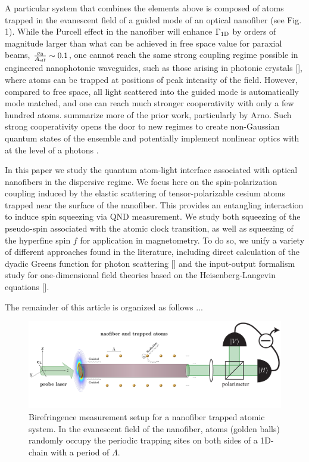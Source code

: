 \documentclass[preprint,aps,pra,onecolumn]{revtex4-1} %
\newcommand{\oneD}{{\rm 1D}}
\begin{document}
A particular system that combines the elements above is composed of atoms trapped in the evanescent field of a guided mode of an optical nanofiber \cite{vetsch_nanofiber-based_2012, lacroute_state-insensitive_2012} (see Fig. 1).  While the Purcell effect in the nanofiber will enhance  $\Gamma_{\oneD}$ by orders of magnitude larger than what can be achieved in free space value for paraxial beams,  $\frac{\sigma_0}{A_{\text{eff}}} \sim 0.1$, one cannot reach the same strong coupling regime possible in engineered nanophotonic waveguides, such as those arising in photonic crystals [], where atoms can be trapped at positions of peak intensity of the field.  However, compared to free space, all light scattered into the guided mode is automatically mode matched, and one can reach much stronger cooperativity with only a few hundred atoms.  {\color{red}  summarize more of the prior work, particularly by Arno}.  Such strong cooperativity opens the door to new regimes to create non-Gaussian quantum states of the ensemble \cite{} and potentially implement nonlinear optics with at the level of a photons \cite{}.

In this paper we study the quantum atom-light interface associated with optical nanofibers in the 
dispersive regime.  We focus here on the spin-polarization coupling induced by the elastic scattering of 
tensor-polarizable cesium atoms trapped near the surface of the nanofiber.  This provides an entangling 
interaction to induce spin squeezing via QND measurement.  We study both squeezing of the 
pseudo-spin associated with the atomic clock transition, as well as squeezing of the hyperfine spin $f$ 
for application in magnetometry.  To do so, we unify a variety of different approaches found in the 
literature, including direct calculation of the dyadic Greens function for photon scattering [] and the 
input-output formalism study for one-dimensional field theories based on the Heisenberg-Langevin 
equations [].

The remainder of this article is organized as follows ...

\begin{figure}
\centering
\includegraphics[scale=0.35]{./Figs/BirefringenceMeasurement_randomAtoms}
\caption{Birefringence measurement setup for a nanofiber trapped atomic system. In the evanescent 
field of the nanofiber, atoms (golden balls) randomly  occupy the periodic trapping sites on both sides of 
a 1D-chain with a period of $\Lambda$.}
\label{fig:BirefringenceMeasurement}
\end{figure}
\end{document}
